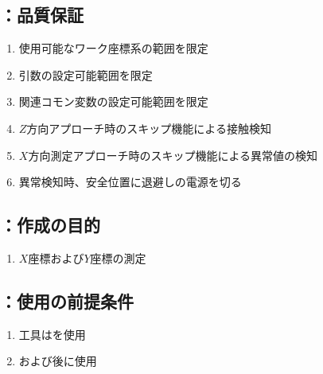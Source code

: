 \subsection{\MXIface：品質保証}
\begin{enumerate}[label*=\sarrow]
\item 使用可能なワーク座標系の範囲を限定
\item {}引数の設定可能範囲を限定
\item 関連コモン変数の設定可能範囲を限定
\item $Z$方向アプローチ時のスキップ機能による接触検知
\item $X$方向測定アプローチ時のスキップ機能による異常値の検知
\item 異常検知時、安全位置に退避し\TouchSensorProbe の電源を切る
\end{enumerate}



\clearpage


\subsection{\MCenterline：作成の目的}
\begin{enumerate}[label*=\sarrow]
\item \CenterlineEndFaceDif $X$座標および$Y$座標の測定
\end{enumerate}


\subsection{\MCenterline：使用の前提条件}
\begin{enumerate}[label*=\sarrow]
\item 工具は\TouchSensorProbe を使用
\item \TopOutcutMilling および\BottomOutcutMilling 後に使用
\end{enumerate}



